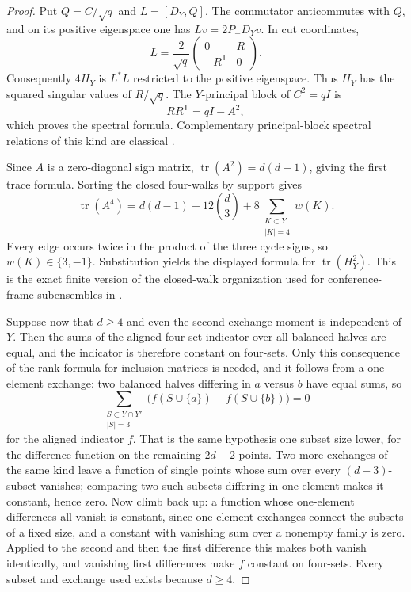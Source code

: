 \begin{proof}
Put \(Q=C/\sqrt q\) and \(L=[D_Y,Q]\).  The commutator anticommutes with
\(Q\), and on its positive eigenspace one has \(Lv=2P_-D_Yv\).  In cut
coordinates,
\[
 L=\frac2{\sqrt q}
 \begin{pmatrix}0&R\\-R^{\mathsf T}&0\end{pmatrix}.
\]
Consequently \(4H_Y\) is \(L^*L\) restricted to the positive eigenspace.
Thus \(H_Y\) has the squared singular values of \(R/\sqrt q\).  The
\(Y\)-principal block of \(C^2=qI\) is
\[
 RR^{\mathsf T}=qI-A^2,
\]
which proves the spectral formula.  Complementary principal-block spectral
relations of this kind are classical \cite{HaemersParsaeiMajd}.

Since \(A\) is a zero-diagonal sign matrix,
\(\operatorname{tr}(A^2)=d(d-1)\), giving the first trace formula.  Sorting
the closed four-walks by support gives
\[
 \operatorname{tr}(A^4)=d(d-1)+12\binom d3
   +8\sum_{\substack{K\subset Y\\|K|=4}}w(K).
\]
Every edge occurs twice in the product of the three cycle signs, so
\(w(K)\in\{3,-1\}\).  Substitution yields the displayed formula for
\(\operatorname{tr}(H_Y^2)\).  This is the exact finite version of the
closed-walk organization used for conference-frame subensembles in
\cite{MagsinoMixonParshall}.

Suppose now that \(d\geq4\) and even the second exchange moment is independent
of \(Y\).  Then the sums of the aligned-four-set indicator over all balanced
halves are equal, and the indicator is therefore constant on four-sets.  Only
this consequence of the rank formula for inclusion matrices
\cite[Theorem~1]{JolliffeInclusion} is needed, and it follows from a
one-element exchange: two balanced halves differing in \(a\) versus \(b\) have
equal sums, so
\[
 \sum_{\substack{S\subset Y\cap Y'\\ |S|=3}}
   \bigl(f(S\cup\{a\})-f(S\cup\{b\})\bigr)=0
\]
for the aligned indicator \(f\).  That is the same hypothesis one subset size
lower, for the difference function on the remaining \(2d-2\) points.  Two
more exchanges of the same kind leave a function of single points whose sum
over every \((d-3)\)-subset vanishes; comparing two such subsets differing in
one element makes it constant, hence zero.  Now climb back up: a function
whose one-element differences all vanish is constant, since one-element
exchanges connect the subsets of a fixed size, and a constant with vanishing
sum over a nonempty family is zero.  Applied to the second and then the first
difference this makes both vanish identically, and vanishing first
differences make \(f\) constant on four-sets.  Every subset and exchange used
exists because \(d\geq4\).


\end{proof}
